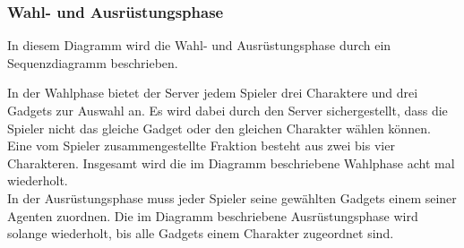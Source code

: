 \subsubsection{Wahl- und Ausrüstungsphase}
In diesem Diagramm wird die Wahl- und Ausrüstungsphase durch ein Sequenzdiagramm beschrieben.


In der Wahlphase bietet der Server jedem Spieler drei Charaktere und drei Gadgets zur Auswahl an. 
Es wird dabei durch den Server sichergestellt, dass die Spieler nicht das gleiche Gadget oder den gleichen Charakter wählen können.\\
Eine vom Spieler zusammengestellte Fraktion besteht aus zwei bis vier Charakteren.
Insgesamt wird die im Diagramm beschriebene Wahlphase acht mal wiederholt.\\

In der Ausrüstungsphase muss jeder Spieler seine gewählten Gadgets einem seiner Agenten zuordnen. Die im Diagramm beschriebene Ausrüstungsphase wird solange wiederholt, bis alle Gadgets einem Charakter zugeordnet sind.
